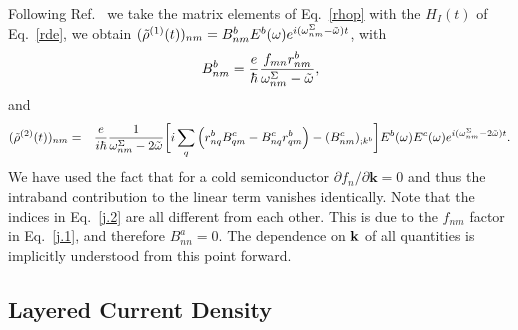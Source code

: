 \documentclass[floatfix,prb,aps,superscriptaddress,showpacs,11pt,preprint,letterpaper]{revtex4}
\begin{document}
Following Ref.~ we take the
matrix elements of Eq.~\eqref{rhop} with the $H_{I}(t)$ of 
Eq.~\eqref{rde}, we obtain 
$(\tilde{\rho}^{(1)}(t))_{nm}=B_{nm}^{b}E^{b}(\omega)e^{i(\omega^\Sigma_{nm}-\tilde\omega)t}$,
with 
\begin{equation}\label{j.1}
B_{nm}^{b}=\frac{e}{\hbar }\frac{f_{mn}r_{nm}^{b}}{\omega^\Sigma_{nm}-\tilde\omega},
\end{equation}
and 
\begin{eqnarray}\label{j.2}
(\tilde{\rho}^{(2)}(t))_{nm} &=&\frac{e}{i\hbar }\frac{1}{\omega^\Sigma_{nm}-2\tilde\omega}\bigg[
i\sum_{q }\Big(r_{nq }^{b}B_{q m}^{c}-B_{nq}^{c}r_{q m}^{b}
\Big)  
-(B_{nm}^{c})_{;k^{b}}\bigg]E^{b}(\omega)E^{c}(\omega)e^{i(\omega^\Sigma_{nm}-2\tilde\omega)t}
.
\end{eqnarray}
We have used the fact that for a cold semiconductor $\partial
f_{n}/\partial \mathbf{k}=0$ and thus the intraband contribution to the linear
term vanishes identically. 
Note that the indices in Eq.~\eqref{j.2} are all different from each
other. This is due to the $f_{nm}$ factor in Eq.~\eqref{j.1}, 
and therefore $B^a_{nn}=0$. The dependence on $\mathbf{k}$ 
of all quantities is implicitly understood from 
this point forward.

\subsection{Layered Current Density}\label{cd}

\end{document}
